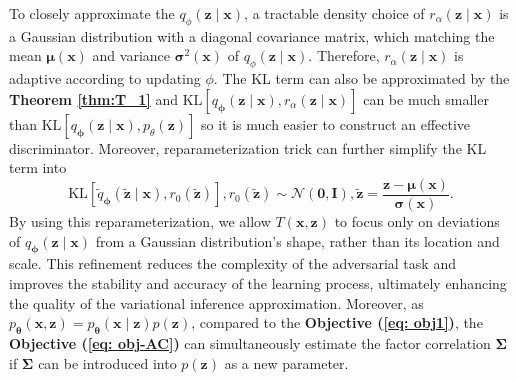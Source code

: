 \documentclass[a4paper,12pt]{article}
\theoremstyle{plain} %
\theoremstyle{remark} %
\theoremstyle{definition} %
\begin{document}
To closely approximate the $q_{\phi}(\bm{z}\mid\bm{x})$, a tractable density choice of $r_{\alpha}(\bm{z}\mid\bm{x})$ is a Gaussian distribution with a diagonal covariance matrix, which matching the mean $\bm{\mu}(\bm{x})$ and variance $\bm{\sigma}^2(\bm{x})$ of $q_{\phi}(\bm{z}\mid\bm{x})$. Therefore, $r_{\alpha}(\bm{z}\mid\bm{x})$ is adaptive according to updating $\phi$. The KL term can also be approximated by the \textbf{Theorem \ref{thm:T_1}} and $\text{KL}\left[ q_{\bm{\phi}}(\bm{z}\mid\bm{x}), r_{\alpha}(\bm{z}\mid\bm{x})\right]$ can be much smaller than $\text{KL}\left[ q_{\bm{\phi}}(\bm{z}\mid\bm{x}), p_{\theta}(\bm{z})\right]$ so it is much easier to construct an effective discriminator. Moreover, reparameterization trick can further simplify the KL term into 
\begin{equation}\label{eq:AC-rep}
    \text{KL}\left[\tilde{q}_{\bm{\phi}}(\tilde{\bm{z}}\mid\bm{x}), r_{0}(\tilde{\bm{z}})\right], r_{0}(\tilde{\bm{z}})\sim \mathcal{N}(\bm{0},\bm{I}), \tilde{\bm{z}} = \frac{\bm{z} - \bm{\mu}(\bm{x})}{\bm{\sigma}(\bm{x})}.
\end{equation}
By using this reparameterization, we allow $T(\bm{x},\bm{z})$ to focus only on deviations of $q_{\bm{\phi}}(\bm{z}\mid\bm{x})$ from a Gaussian distribution's shape, rather than its location and scale. This refinement reduces the complexity of the adversarial task and improves the stability and accuracy of the learning process, ultimately enhancing the quality of the variational inference approximation. Moreover, as $p_{\bm{\theta}}(\bm{x},\bm{z}) = p_{\bm{\theta}}(\bm{x} \mid \bm{z})p(\bm{z})$, compared to the \textbf{Objective (\ref{eq: obj1})}, the \textbf{Objective (\ref{eq: obj-AC})} can simultaneously estimate the factor correlation $\bm{\Sigma}$ if $\bm{\Sigma}$ can be introduced into $p(\bm{z})$ as a new parameter.
\end{document}
